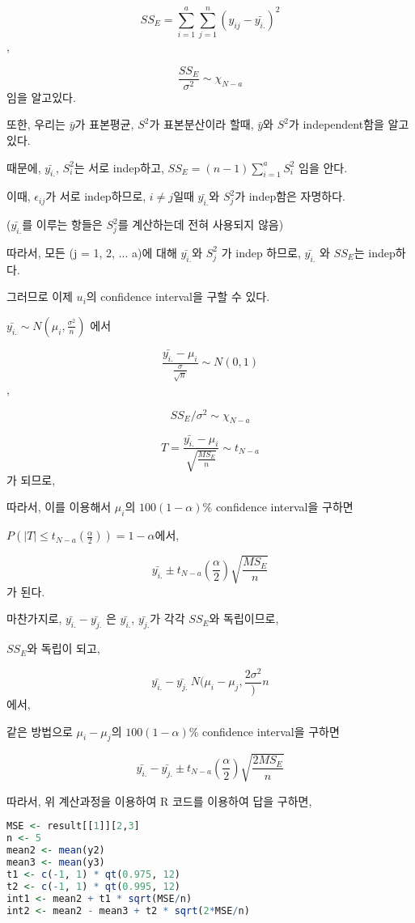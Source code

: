 \documentclass{article}
\begin{document}
$$SS_E = \sum_{i=1}^a \sum_{j=1}^n (y_{ij} - \bar{y_{i.}})^2$$,

$$\frac{SS_E}{\sigma^2} \sim \chi_{N-a}$$ 임을 알고있다.

또한, 우리는 $\bar{y}$가 표본평균, $S^2$가 표본분산이라 할때,  $\bar{y}$와 $S^2$가 independent함을 알고 있다.

때문에, $\bar{y_{i.}}$, $S_i^2$는 서로 indep하고, $SS_E = (n-1)\sum_{i=1}^a S_i^2$ 임을 안다.

이때, $\epsilon_{ij}$가 서로 indep하므로, $i \neq j$일때 $\bar{y_{i.}}$와 $S_j^2$가 indep함은 자명하다.

($\bar{y_{i.}}$를 이루는 항들은 $S_j^2$를 계산하는데 전혀 사용되지 않음)

따라서, 모든 (j = 1, 2, ... a)에 대해 $\bar{y_{i.}}$와 $S_j^2$ 가 indep 하므로, $\bar{y_{i.}}$ 와 $SS_E$는 indep하다.


그러므로 이제 $u_i$의 confidence interval을 구할 수 있다.

$\bar{y_{i.}} \sim N(\mu_i, \frac{\sigma^2}{n})$ 에서

$$\frac{\bar{y_{i.}} - \mu_i}{\frac{\sigma}{\sqrt{n}}} \sim N(0,1)$$,

$$SS_E/\sigma^2 \sim \chi_{N-a}$$

$$T = \frac{\bar{y_{i.}} - \mu_i}{\sqrt{\frac{MS_E}{n}}} \sim t_{N-a}$$가 되므로,

따라서, 이를 이용해서 $\mu_i$의 $100(1-\alpha)\%$ confidence interval을 구하면

$P(|T| \le t_{N-a}(\frac{\alpha}{2})) = 1-\alpha$에서,

$$\bar{y_{i.}} \pm t_{N-a}(\frac{\alpha}{2}) \sqrt{\frac{MS_E}{n}}$$ 가 된다.

마찬가지로, $\bar{y_{i.}} - \bar{y_{j.}}$ 은 $\bar{y_{i.}}$, $\bar{y_{j.}}$가 각각 $SS_E$와 독립이므로,

$SS_E$와 독립이 되고,

$$\bar{y_{i.}} - \bar{y_{j.}} ~ N(\mu_i - \mu_j, \frac{2\sigma^2}){n}$$ 에서,

같은 방법으로 $\mu_i - \mu_j$의 $100(1-\alpha)\%$ confidence interval을 구하면

$$\bar{y_{i.}} - \bar{y_{j.}} \pm t_{N-a}(\frac{\alpha}{2}) \sqrt{\frac{2 MS_E}{n}}$$


따라서, 위 계산과정을 이용하여 R 코드를 이용하여 답을 구하면,

\begin{lstlisting}[language=R]
MSE <- result[[1]][2,3]
n <- 5
mean2 <- mean(y2)
mean3 <- mean(y3)
t1 <- c(-1, 1) * qt(0.975, 12)
t2 <- c(-1, 1) * qt(0.995, 12)
int1 <- mean2 + t1 * sqrt(MSE/n)
int2 <- mean2 - mean3 + t2 * sqrt(2*MSE/n)
\end{lstlisting}
\end{document}
